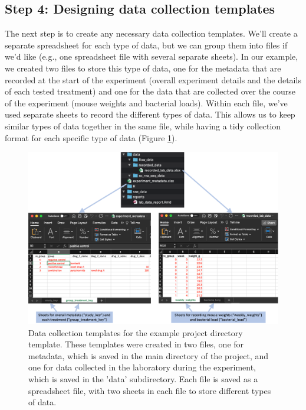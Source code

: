 \documentclass[]{tufte-book}
\begin{document}
\subsection{Step 4: Designing data collection templates}\label{step-4-designing-data-collection-templates}

The next step is to create any necessary data collection templates. We'll create
a separate spreadsheet for each type of data, but we can group them into files
if we'd like (e.g., one spreadsheet file with several separate sheets). In our
example, we created two files to store this type of data, one for the metadata
that are recorded at the start of the experiment (overall experiment details and
the details of each tested treatment) and one for the data that are collected
over the course of the experiment (mouse weights and bacterial loads). Within
each file, we've used separate sheets to record the different types of data.
This allows us to keep similar types of data together in the same file, while
having a tidy collection format for each specific type of data (Figure
\ref{fig:projectdatacollection}).

\begin{figure}
\includegraphics[width=\textwidth]{figures/project_data_collection} \caption[Data collection templates for the example project directory template]{Data collection templates for the example project directory template. These templates were created in two files, one for metadata, which is saved in the main directory of the project, and one for data collected in the laboratory during the experiment, which is saved in the 'data' subdirectory. Each file is saved as a spreadsheet file, with two sheets in each file to store different types of data.}\label{fig:projectdatacollection}
\end{figure}
\end{document}
